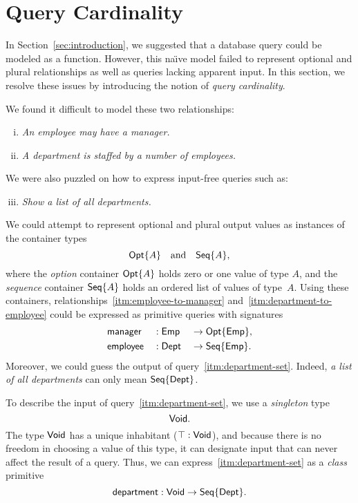 
\section{Query Cardinality}
\label{sec:cardinality}

In Section~\ref{sec:introduction}, we suggested that a database query could be
modeled as a function.  However, this na\"{\i}ve model failed to represent
optional and plural relationships as well as queries lacking apparent input.
In this section, we resolve these issues by introducing the notion of
\emph{query cardinality}.

We found it difficult to model these two relationships:

\begin{enumerate}[(i)]
\item \label{itm:employee-to-manager}
\emph{An employee may have a manager.}

\item \label{itm:department-to-employee}
\emph{A department is staffed by a number of employees.}
\end{enumerate}

We were also puzzled on how to express input-free queries such as:

\begin{enumerate}[(i)]
\setcounter{enumi}{2}
\item \label{itm:department-set}
\emph{Show a list of all departments.}
\end{enumerate}

We could attempt to represent optional and plural output values as instances of
the container types
\begin{equation*}
    \mathsf{Opt}{\left\{A\right\}} \quad \text{and} \quad \mathsf{Seq}{\left\{A\right\}},
\end{equation*}
where the \emph{option} container $\mathsf{Opt}{\left\{A\right\}}$ holds zero or one value of type
$A$, and the \emph{sequence} container $\mathsf{Seq}{\left\{A\right\}}$ holds an ordered list of
values of type~$A$.  Using these containers,
relationships~\ref{itm:employee-to-manager}
and~\ref{itm:department-to-employee} could be expressed as primitive queries
with signatures
\begin{alignat*}{3}
    & \mathsf{manager} && : \mathsf{Emp} && \to \mathsf{Opt}{\left\{\mathsf{Emp}\right\}}, \\
    & \mathsf{employee} && : \mathsf{Dept} && \to \mathsf{Seq}{\left\{\mathsf{Emp}\right\}}.
\end{alignat*}
Moreover, we could guess the output of query~\ref{itm:department-set}.  Indeed,
\emph{a list of all departments} can only mean $\mathsf{Seq}{\left\{\mathsf{Dept}\right\}}$.

To describe the input of query~\ref{itm:department-set}, we use a
\emph{singleton} type
\begin{equation*}
    \mathsf{Void}.
\end{equation*}
The type $\mathsf{Void}$ has a unique inhabitant ($\top:\mathsf{Void}$), and because there is no
freedom in choosing a value of this type, it can designate input that can never
affect the result of a query.  Thus, we can express~\ref{itm:department-set} as
a \emph{class} primitive
\begin{equation*}
    \mathsf{department} : \mathsf{Void} \to \mathsf{Seq}{\left\{\mathsf{Dept}\right\}}.
\end{equation*}

